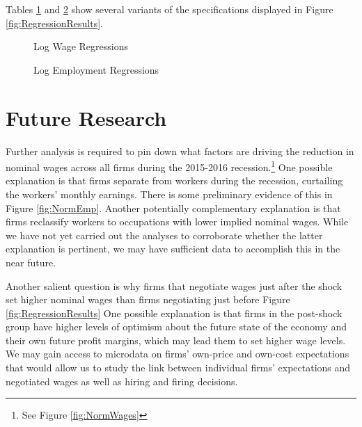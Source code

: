 \documentclass[12pt]{article}
\begin{document}
	Tables \ref{tab:wage_reg} and \ref{tab:emp_reg} show several variants of the specifications displayed in Figure \ref{fig:RegressionResults}. 
		\begin{figure}[!ht]
				\caption{Log Wage Regressions}
				\label{tab:wage_reg}
				\tiny{}
		\end{figure}

		\begin{figure}[!ht]
			\caption{Log Employment Regressions}
			\label{tab:emp_reg}
			\tiny{}
		\end{figure}

	\section{Future Research}
	Further analysis is required to pin down what factors are driving the reduction in nominal wages across all firms during the 2015-2016 recession.\footnote{See Figure \ref{fig:NormWages}} One possible explanation is that firms separate from workers during the recession, curtailing the workers' monthly earnings. There is some preliminary evidence of this in Figure \ref{fig:NormEmp}. Another potentially complementary explanation is that firms reclassify workers to occupations with lower implied nominal wages. While we have not yet carried out the analyses to corroborate whether the latter explanation is pertinent, we may have sufficient data to accomplish this in the near future.

	Another salient question is why firms that negotiate wages just after the shock set higher nominal wages than firms negotiating just before Figure \ref{fig:RegressionResults} One possible explanation is that firms in the post-shock group have higher levels of optimism about the future state of the economy and their own future profit margins, which may lead them to set higher wage levels. We may gain access to microdata on firms' own-price and own-cost expectations that would allow us to study the link between individual firms' expectations and negotiated wages as well as hiring and firing decisions.  
\end{document}
